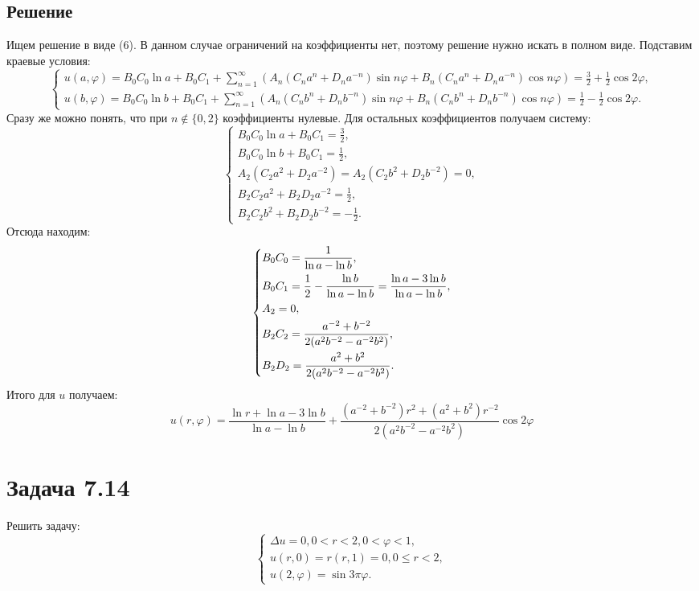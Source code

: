 \documentclass[11pt]{article}
\begin{document}
\subsection{Решение}
\label{sec:orgef94cf5}
Ищем решение в виде (6). В данном случае ограничений на коэффициенты нет, поэтому решение
нужно искать в полном виде. Подставим краевые условия:
\begin{equation*}
\begin{cases}
u(a, \varphi) = B_0C_0\ln a + B_0C_1 + \sum_{n = 1}^{\infty}(A_n(C_na^n + D_na^{-n})\sin n\varphi +
B_n(C_na^n + D_na^{-n})\cos n\varphi) = \frac32 + \frac12\cos2\varphi, \\
u(b, \varphi) = B_0C_0\ln b + B_0C_1 + \sum_{n = 1}^{\infty}(A_n(C_nb^n + D_nb^{-n})\sin n\varphi +
B_n(C_nb^n + D_nb^{-n})\cos n\varphi) = \frac12 - \frac12\cos2\varphi.
\end{cases}
\end{equation*}
Сразу же можно понять, что при $n \notin \{0, 2\}$ коэффициенты нулевые. Для остальных коэффициентов получаем систему:
\begin{equation*}
\begin{cases}
B_0C_0\ln a + B_0C_1 = \frac32, \\
B_0C_0\ln b + B_0C_1 = \frac12, \\
A_2(C_2a^2 + D_2a^{-2}) = A_2(C_2b^2 + D_2b^{-2}) = 0, \\
B_2C_2a^2 + B_2D_2a^{-2} = \frac12, \\
B_2C_2b^2 + B_2D_2b^{-2} = -\frac12.
\end{cases}
\end{equation*}
Отсюда находим:
\begin{equation*}
\begin{dcases}
B_0C_0 = \frac1{\ln a - \ln b}, \\
B_0C_1 = \frac12 - \frac{\ln b}{\ln a - \ln b} = \frac{\ln a - 3\ln b}{\ln a - \ln b}, \\
A_2 = 0, \\
B_2C_2 = \frac{a^{-2} + b^{-2}}{2(a^2b^{-2} - a^{-2}b^2)}, \\
B_2D_2 = \frac{a^2 + b^2}{2(a^2b^{-2} - a^{-2}b^2)}.
\end{dcases}
\end{equation*}
Итого для $u$ получаем:
\begin{equation}
u(r, \varphi) = \frac{\ln r + \ln a - 3\ln b}{\ln a - \ln b} +
\frac{(a^{-2} + b^{-2})r^2 + (a^2 + b^2)r^{-2}}{2(a^2b^{-2} - a^{-2}b^2)}\cos2\varphi
\end{equation}
\section{Задача 7.14}
\label{sec:orge2b8e87}
Решить задачу:
\begin{equation}
\begin{cases}
\Delta u = 0, 0 < r < 2, 0 < \varphi < 1, \\
u(r, 0) = r(r, 1) = 0, 0 \leq r < 2, \\
u(2, \varphi) = \sin3\pi\varphi.
\end{cases}
\end{equation}
\end{document}
